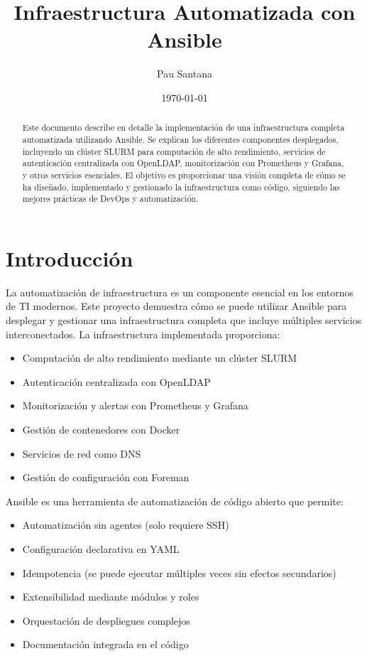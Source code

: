 \documentclass[12pt,a4paper]{article}
\title{\Huge\bfseries Infraestructura Automatizada con Ansible}
\author{\Large Pau Santana}
\date{\today}
\begin{document}
\maketitle

\begin{abstract}
\noindent Este documento describe en detalle la implementación de una infraestructura completa automatizada utilizando Ansible. Se explican los diferentes componentes desplegados, incluyendo un clúster SLURM para computación de alto rendimiento, servicios de autenticación centralizada con OpenLDAP, monitorización con Prometheus y Grafana, y otros servicios esenciales. El objetivo es proporcionar una visión completa de cómo se ha diseñado, implementado y gestionado la infraestructura como código, siguiendo las mejores prácticas de DevOps y automatización.
\end{abstract}

\newpage
\tableofcontents
\newpage

\section{Introducción}
\newpage

La automatización de infraestructura es un componente esencial en los entornos de TI modernos. Este proyecto demuestra cómo se puede utilizar Ansible para desplegar y gestionar una infraestructura completa que incluye múltiples servicios interconectados. La infraestructura implementada proporciona:

\begin{itemize}[leftmargin=*]
    \item Computación de alto rendimiento mediante un clúster SLURM
    \item Autenticación centralizada con OpenLDAP
    \item Monitorización y alertas con Prometheus y Grafana
    \item Gestión de contenedores con Docker
    \item Servicios de red como DNS
    \item Gestión de configuración con Foreman
\end{itemize}

\begin{infobox}
Ansible es una herramienta de automatización de código abierto que permite:
\begin{itemize}
    \item Automatización sin agentes (solo requiere SSH)
    \item Configuración declarativa en YAML
    \item Idempotencia (se puede ejecutar múltiples veces sin efectos secundarios)
    \item Extensibilidad mediante módulos y roles
    \item Orquestación de despliegues complejos
    \item Documentación integrada en el código
\end{itemize}
\end{infobox}
\end{document}
